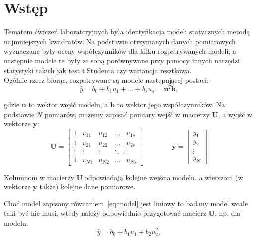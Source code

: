 \documentclass[11pt, a4paper]{article}
\begin{document}
\newpage

\section{Wstęp}

Tematem ćwiczeń laboratoryjnych była identyfikacja modeli statycznych metodą najmniejszych kwadratów. Na podstawie otrzymanych danych pomiarowych wyznaczane były oceny współczynników dla kilku rozpatrywanych modeli, a następnie modele te były ze sobą porównywane przy pomocy innych narzędzi statystyki takich jak test t Studenta czy wariancja resztkowa.\\

Ogólnie rzecz biorąc, rozpatrywane są modele następującej postaci:
\begin{equation}
	\hat{y} =
	b_0 + b_1 u_1 + \ldots + b_s u_s =
	\mathbf{u}^T \mathbf{b},
	\label{eq:model}
\end{equation}

gdzie $\mathbf{u}$ to wektor wejść modelu, a $\mathbf{b}$ to wektor jego współczynników. Na podstawie $N$ pomiarów, możemy zapisać pomiary wejść w macierzy $\mathbf{U}$, a wyjść w wektorze $\mathbf{y}$:
\begin{equation}
	\mathbf{U} =
		\begin{bmatrix}
		1 & u_{11} & u_{12} & \ldots & u_{1s} \\
		1 & u_{21} & u_{22} & \ldots & u_{2s} \\
		\vdots & \vdots & \vdots & \ddots & \vdots \\
		1 & u_{N1} & u_{N2} & \ldots & u_{Ns}
		\end{bmatrix}
	\qquad \qquad
	\mathbf{y} =
		\begin{bmatrix}
		y_1 \\ y_2 \\ \vdots \\ y_N
		\end{bmatrix}
\end{equation}

Kolumnom w macierzy $\mathbf{U}$ odpowiadają kolejne wejścia modelu, a wierszom (w wektorze $\mathbf{y}$ także) kolejne dane pomiarowe.

Choć model zapisany równaniem~\ref{eq:model} jest liniowy to badany model wcale taki być nie musi, wtedy należy odpowiednio przygotować macierz $\mathbf{U}$, np. dla modelu:
\begin{equation}
	\hat{y} = b_0 + b_1 u_1 + b_2 u_2^2,
\end{equation}
\end{document}
